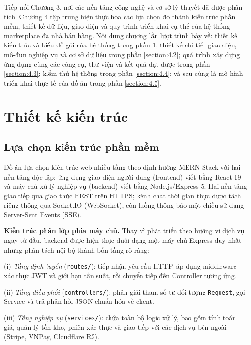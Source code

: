 \documentclass[../DoAn.tex]{subfiles}
\begin{document}
Tiếp nối Chương 3, nơi các nền tảng công nghệ và cơ sở lý thuyết đã được phân tích, Chương 4 tập trung hiện thực hóa các lựa chọn đó thành kiến trúc phần mềm, thiết kế dữ liệu, giao diện và quy trình triển khai cụ thể của hệ thống marketplace đa nhà bán hàng. Nội dung chương lần lượt trình bày về: thiết kế kiến trúc và biểu đồ gói của hệ thống trong phần \ref{section:4.1}; thiết kế chi tiết giao diện, mô-đun nghiệp vụ và cơ sở dữ liệu trong phần \ref{section:4.2}; quá trình xây dựng ứng dụng cùng các công cụ, thư viện và kết quả đạt được trong phần \ref{section:4.3}; kiểm thử hệ thống trong phần \ref{section:4.4}; và sau cùng là mô hình triển khai thực tế của đồ án trong phần \ref{section:4.5}.

\section{Thiết kế kiến trúc}
\label{section:4.1}

\subsection{Lựa chọn kiến trúc phần mềm}
Đồ án lựa chọn kiến trúc web nhiều tầng theo định hướng MERN Stack với hai nền tảng độc lập: ứng dụng giao diện người dùng (frontend) viết bằng React 19 và máy chủ xử lý nghiệp vụ (backend) viết bằng Node.js/Express 5. Hai nền tảng giao tiếp qua giao thức REST trên HTTPS; kênh chat thời gian thực được tách riêng thông qua Socket.IO (WebSocket), còn luồng thông báo một chiều sử dụng Server-Sent Events (SSE).

\textbf{Kiến trúc phân lớp phía máy chủ.} Thay vì phát triển theo hướng vi dịch vụ ngay từ đầu, backend được hiện thực dưới dạng một máy chủ Express duy nhất nhưng phân tách nội bộ thành bốn tầng rõ ràng:

(i) \textit{Tầng định tuyến} (\texttt{routes/}): tiếp nhận yêu cầu HTTP, áp dụng middleware xác thực JWT và giới hạn tần suất, rồi chuyển tiếp đến Controller tương ứng.

(ii) \textit{Tầng điều phối} (\texttt{controllers/}): phân giải tham số từ đối tượng \texttt{Request}, gọi Service và trả phản hồi JSON chuẩn hóa về client.

(iii) \textit{Tầng nghiệp vụ} (\texttt{services/}): chứa toàn bộ logic xử lý, bao gồm tính toán giá, quản lý tồn kho, phiên xác thực và giao tiếp với các dịch vụ bên ngoài (Stripe, VNPay, Cloudflare R2).
\end{document}
